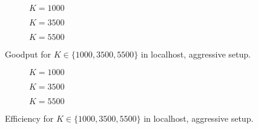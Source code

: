 \begin{figure}[t!]
\centering
\begin{subfigure}{0.24\textwidth}
	\captionsetup{justification=centering,font=scriptsize}
	\centering
	\setlength\fwidth{\textwidth}
	\setlength{}
	
	\caption{$K=1000$}
	\label{fig:lh_good_1000}
\end{subfigure}\hspace{2em}%
\begin{subfigure}{0.23\textwidth}
	\captionsetup{justification=centering,font=scriptsize}
	\centering
	\setlength\fwidth{\textwidth}
	\setlength{}
	
	\caption{$K=3500$}
	\label{fig:lh_good_3500}
\end{subfigure}\hspace{2em}%
\begin{subfigure}{0.23\textwidth}
	\captionsetup{justification=centering,font=scriptsize}
	\centering
	\setlength\fwidth{\textwidth}
	\setlength{}
	
	\caption{$K=5500$}
	\label{fig:lh_good_5500}
\end{subfigure}
\caption{Goodput for $K \in \{1000, 3500, 5500\}$ in localhost, aggressive setup.}
\label{fig:goodput_aggr}
\end{figure}
\begin{figure}[t!]
\centering
\begin{subfigure}{0.23\textwidth}
	\captionsetup{justification=centering,font=scriptsize}
	\centering
	\setlength\fwidth{\textwidth}
	\setlength{}
	
	\caption{$K=1000$}
	\label{fig:lh_eff_1000}
\end{subfigure}\hspace{2em}%
\begin{subfigure}{0.23\textwidth}
	\captionsetup{justification=centering,font=scriptsize}
	\centering
	\setlength\fwidth{\textwidth}
	\setlength{}
	
	\caption{$K=3500$}
	\label{fig:lh_eff_3500}
\end{subfigure}\hspace{2em}%
\begin{subfigure}{0.23\textwidth}
	\captionsetup{justification=centering,font=scriptsize}
	\centering
	\setlength\fwidth{\textwidth}
	\setlength{}
	
	\caption{$K=5500$}
	\label{fig:lh_eff_5500}
\end{subfigure}
\caption{Efficiency for $K \in \{1000, 3500, 5500\}$ in localhost, aggressive setup.}
\label{fig:efficiency_aggr}
\end{figure}
